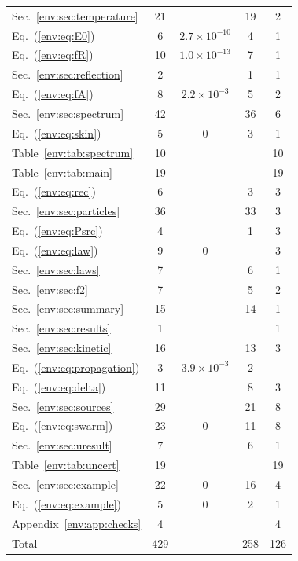 \begin{longtable}{L{4.0cm}cccc}
Sec.~\ref*{env:sec:temperature} & 21 &  & 19 & 2\\
Eq.~(\ref*{env:eq:E0}) & 6 & $2.7\times10^{-10}$ & 4 & 1\\
Eq.~(\ref*{env:eq:fR}) & 10 & $1.0\times10^{-13}$ & 7 & 1\\
Sec.~\ref*{env:sec:reflection} & 2 &  & 1 & 1\\
Eq.~(\ref*{env:eq:fA}) & 8 & $2.2\times10^{-3}$ & 5 & 2\\
Sec.~\ref*{env:sec:spectrum} & 42 &  & 36 & 6\\
Eq.~(\ref*{env:eq:skin}) & 5 & $0$ & 3 & 1\\
Table~\ref*{env:tab:spectrum} & 10 &  &  & 10\\
Table~\ref*{env:tab:main} & 19 &  &  & 19\\
Eq.~(\ref*{env:eq:rec}) & 6 &  & 3 & 3\\
Sec.~\ref*{env:sec:particles} & 36 &  & 33 & 3\\
Eq.~(\ref*{env:eq:Psrc}) & 4 &  & 1 & 3\\
Eq.~(\ref*{env:eq:law}) & 9 & $0$ &  & 3\\
Sec.~\ref*{env:sec:laws} & 7 &  & 6 & 1\\
Sec.~\ref*{env:sec:f2} & 7 &  & 5 & 2\\
Sec.~\ref*{env:sec:summary} & 15 &  & 14 & 1\\
Sec.~\ref*{env:sec:results} & 1 &  &  & 1\\
Sec.~\ref*{env:sec:kinetic} & 16 &  & 13 & 3\\
Eq.~(\ref*{env:eq:propagation}) & 3 & $3.9\times10^{-3}$ & 2 & \\
Eq.~(\ref*{env:eq:delta}) & 11 &  & 8 & 3\\
Sec.~\ref*{env:sec:sources} & 29 &  & 21 & 8\\
Eq.~(\ref*{env:eq:swarm}) & 23 & $0$ & 11 & 8\\
Sec.~\ref*{env:sec:uresult} & 7 &  & 6 & 1\\
Table~\ref*{env:tab:uncert} & 19 &  &  & 19\\
Sec.~\ref*{env:sec:example} & 22 & $0$ & 16 & 4\\
Eq.~(\ref*{env:eq:example}) & 5 & $0$ & 2 & 1\\
Appendix~\ref*{env:app:checks} & 4 &  &  & 4\\
\midrule
Total & 429 & & 258 & 126\\
\end{longtable}
